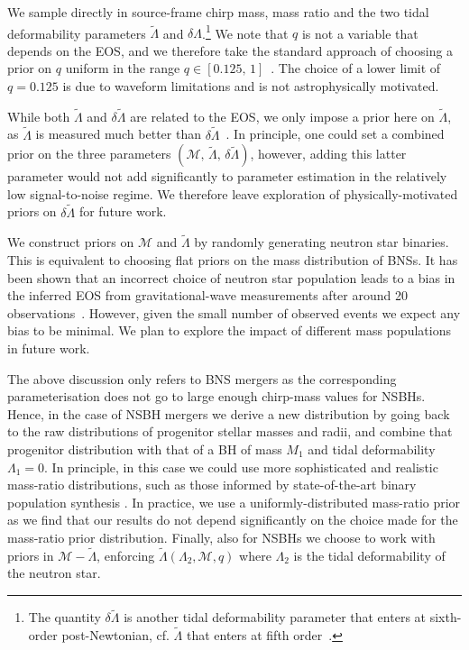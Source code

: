\documentclass[twocolumn,linenumbers]{aastex631}
\begin{document}
We sample directly in source-frame chirp mass, mass ratio and the two
tidal deformability parameters $\tilde{\Lambda}$ and
$\delta\Lambda$.\footnote{The quantity $\delta\tilde{\Lambda}$ is another
tidal deformability parameter that enters at sixth-order post-Newtonian,
cf. $\tilde{\Lambda}$ that enters at fifth order~\citep[see][for
  definitions of the these quantities]{favata14,wade14}.}  We note that
$q$ is not a variable that depends on the EOS, and we therefore take the
standard approach of choosing a prior on $q$ uniform in the range
$q\in[0.125,\,1]$~\citep[e.g.,][]{romeroshaw20}. The choice of a lower
limit of $q=0.125$ is due to waveform limitations and is not
astrophysically motivated.

While both $\tilde{\Lambda}$ and $\delta\tilde{\Lambda}$ are
related to the EOS, we only impose a prior here on $\tilde{\Lambda}$, as
$\tilde{\Lambda}$ is measured much better than
$\delta\tilde{\Lambda}$~\citep[e.g.,][]{wade14}. In principle, one could
set a combined prior on the three parameters $(\mathcal{M},\,
\tilde{\Lambda}, \,\delta\tilde{\Lambda})$, however, adding this latter
parameter would not add significantly to parameter estimation in the
relatively low signal-to-noise regime. We therefore leave exploration of
physically-motivated priors on $\delta\tilde{\Lambda}$ for future work.

We construct priors on $\mathcal{M}$ and $\tilde{\Lambda}$ by randomly
generating neutron star binaries. This is equivalent to choosing flat
priors on the mass distribution of BNSs. It has been shown that an incorrect choice of neutron star population leads to a bias in the inferred EOS from
gravitational-wave measurements after around 20 observations~\citep[e.g.,][]{2015Agathos,2020Wysocki,2020Landry}. However, given the small number of observed
events we expect any bias to be minimal. We plan to explore
the impact of different mass populations in future work.

The above discussion only refers to BNS mergers as the corresponding
parameterisation does not go to large enough chirp-mass values for
NSBHs. Hence, in the case of NSBH mergers we derive a new distribution by
going back to the raw distributions of progenitor stellar masses and
radii, and combine that progenitor distribution with that of a BH of mass
$M_1$ and tidal deformability $\Lambda_1=0$. In principle, in this case
we could use more sophisticated and realistic mass-ratio distributions,
such as those informed by state-of-the-art binary population synthesis
\citep[e.g.,][]{2021Broekgaarden+}. In practice, we use a
uniformly-distributed mass-ratio prior as we find that our results do not
depend significantly on the choice made for the mass-ratio prior
distribution. Finally, also for NSBHs we choose to work with priors in
$\mathcal{M}\!- \!\tilde{\Lambda}$, enforcing
$\tilde{\Lambda}(\Lambda_2,\mathcal{M},q)$ where $\Lambda_2$ is the tidal
deformability of the neutron star.
\end{document}
